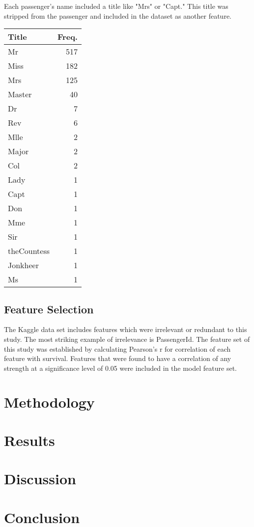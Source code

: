 \documentclass[10pt]{article}
\begin{document}
\begin{multicols}{2}
	Each passenger's name included a title like "Mrs" or "Capt."
	This title was stripped from the passenger and included in the dataset as another feature.\\
	\begin{center}
	\begin{tabular}{l r}
		Title         &	Freq.\\
		\hline
		Mr            & 517\\
		Miss          & 182\\
		Mrs           & 125\\
		Master         & 40\\
		Dr              & 7\\
		Rev             & 6\\
		Mlle            & 2\\
		Major           & 2\\
		Col             & 2\\
		Lady            & 1\\
		Capt            & 1\\
		Don             & 1\\
		Mme             & 1\\
		Sir             & 1\\
		theCountess     & 1\\
		Jonkheer        & 1\\
		Ms              & 1\\
	\end{tabular}
	\end{center}
\subsection{Feature Selection}
	
	The Kaggle data set includes features which were irrelevant or redundant to this study.
	The most striking example of irrelevance is PassengerId.
	The feature set of this study was established by calculating Pearson's r for correlation of each feature with survival.
	Features that were found to have a correlation of any strength at a significance level of 0.05 were included in the model feature set.

\section{Methodology}

\section{Results}

\section{Discussion}

\section{Conclusion}\label{conclusions}

\end{multicols}
\end{document}

